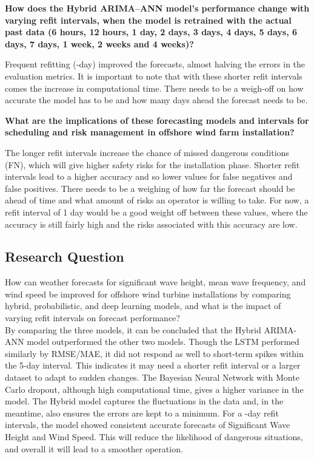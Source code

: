 \noindent \textbf{How does the Hybrid ARIMA–ANN model’s performance change with varying refit intervals, when the model is retrained with the actual past data (6 hours, 12 hours, 1 day, 2 days, 3 days, 4 days, 5 days, 6 days, 7 days, 1 week, 2 weeks and 4 weeks)?}

\noindent Frequent refitting (-day) improved the forecasts, almost halving the errors in the evaluation metrics. It is important to note that with these shorter refit intervals comes the increase in computational time. There needs to be a weigh-off on how accurate the model has to be and how many days ahead the forecast needs to be.

\newpage 

\noindent \textbf{What are the implications of these forecasting models and intervals for scheduling and risk management in offshore wind farm installation?}

\noindent The longer refit intervals increase the chance of missed dangerous conditions (FN), which will give higher safety risks for the installation phase. Shorter refit intervals lead to a higher accuracy and so lower values for false negatives and false positives. There needs to be a weighing of how far the forecast should be ahead of time and what amount of risks an operator is willing to take. For now, a refit interval of 1 day would be a good weight off between these values, where the accuracy is still fairly high and the risks associated with this accuracy are low. 

\subsection*{Research Question}  
How can weather forecasts for significant wave height, mean wave frequency, and wind speed be improved for offshore wind turbine installations by comparing hybrid, probabilistic, and deep learning models, and what is the impact of varying refit intervals on forecast performance?\\

\noindent By comparing the three models, it can be concluded that the Hybrid ARIMA-ANN model outperformed the other two models. Though the LSTM performed similarly by RMSE/MAE, it did not respond as well to short-term spikes within the 5-day interval. This indicates it may need a shorter refit interval or a larger dataset to adapt to sudden changes. The Bayesian Neural Network with Monte Carlo dropout, although high computational time, gives a higher variance in the model. The Hybrid model captures the fluctuations in the data and, in the meantime, also ensures the errors are kept to a minimum. For a -day refit intervals, the model showed consistent accurate forecasts of Significant Wave Height and Wind Speed. This will reduce the likelihood of dangerous situations, and overall it will lead to a smoother operation.